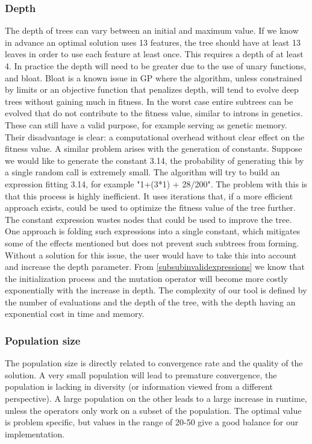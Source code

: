 \subsubsection{Depth}
The depth of trees can vary between an initial and maximum value. If we know in advance an optimal solution uses 13 features, the tree should have at least 13 leaves in order to use each feature at least once. This requires a depth of at least 4. In practice the depth will need to be greater due to the use of unary functions, and bloat. Bloat is a known issue in GP \cite{GPBloat}
where the algorithm, unless constrained by limits or an objective function that penalizes depth, will tend to evolve deep trees without gaining much in fitness. In the worst case entire subtrees can be evolved that do not contribute to the fitness value, similar to introns in genetics. These can still have a valid purpose, for example serving as genetic memory. Their disadvantage is clear: a computational overhead without clear effect on the fitness value.
A similar problem arises with the generation of constants. Suppose we would like to generate the constant 3.14, the probability of generating this by a single random call is extremely small. The algorithm will try to build an expression fitting 3.14, for example "1+(3*1) + 28/200". The problem with this is that this process is highly inefficient. It uses iterations that, if a more efficient approach exists, could be used to optimize the fitness value of the tree further. The constant expression wastes nodes that could be used to improve the tree. One approach is folding such expressions into a single constant, which mitigates some of the effects mentioned but does not prevent such subtrees from forming.
Without a solution for this issue, the user would have to take this into account and increase the depth parameter.
From \ref{subsubinvalidexpressions} we know that the initialization process and the mutation operator will become more costly exponentially with the increase in depth.
The complexity of our tool is defined by the number of evaluations and the depth of the tree, with the depth having an exponential cost in time and memory.

\subsubsection{Population size}
The population size is directly related to convergence rate and the quality of the solution. A very small population will lead to premature convergence, the population is lacking in diversity (or information viewed from a different perspective).
A large population on the other leads to a large increase in runtime, unless the operators only work on a subset of the population. The optimal value is problem specific, but values in the range of 20-50 give a good balance for our implementation.

